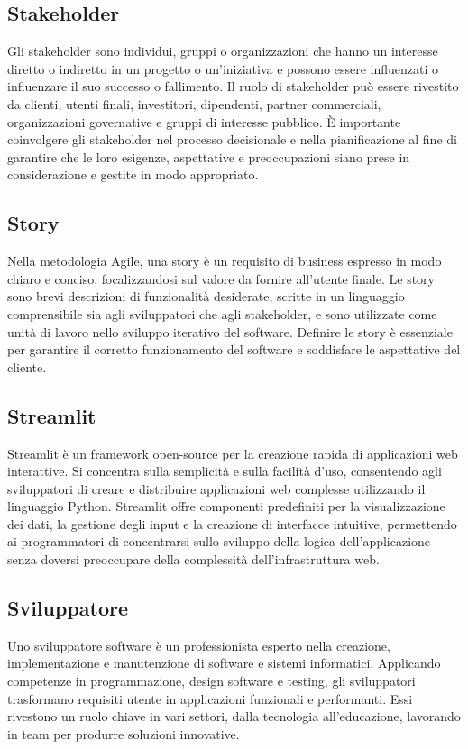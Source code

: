 \vspace{2em}
\subsection*{Stakeholder}
\par Gli stakeholder sono individui, gruppi o organizzazioni che hanno un interesse diretto o indiretto in un progetto o un'iniziativa e possono essere influenzati o influenzare il suo successo o fallimento. Il ruolo di stakeholder può essere rivestito da clienti, utenti finali, investitori, dipendenti, partner commerciali, organizzazioni governative e gruppi di interesse pubblico. È importante coinvolgere gli stakeholder nel processo decisionale e nella pianificazione al fine di garantire che le loro esigenze, aspettative e preoccupazioni siano prese in considerazione e gestite in modo appropriato.

\vspace{2em}
\subsection*{Story}
\par Nella metodologia Agile, una story è un requisito di business espresso in modo chiaro e conciso, focalizzandosi sul valore da fornire all'utente finale. Le story sono brevi descrizioni di funzionalità desiderate, scritte in un linguaggio comprensibile sia agli sviluppatori che agli stakeholder, e sono utilizzate come unità di lavoro nello sviluppo iterativo del software. Definire le story è essenziale per garantire il corretto funzionamento del software e soddisfare le aspettative del cliente.

\vspace{2em}
\subsection*{Streamlit}
\par Streamlit è un framework open-source per la creazione rapida di applicazioni web interattive. Si concentra sulla semplicità e sulla facilità d'uso, consentendo agli sviluppatori di creare e distribuire applicazioni web complesse utilizzando il linguaggio Python. Streamlit offre componenti predefiniti per la visualizzazione dei dati, la gestione degli input e la creazione di interfacce intuitive, permettendo ai programmatori di concentrarsi sullo sviluppo della logica dell'applicazione senza doversi preoccupare della complessità dell'infrastruttura web.

\vspace{2em}
\subsection*{Sviluppatore}
\par Uno sviluppatore software è un professionista esperto nella creazione, implementazione e manutenzione di software e sistemi informatici. Applicando competenze in programmazione, design software e testing, gli sviluppatori trasformano requisiti utente in applicazioni funzionali e performanti. Essi rivestono un ruolo chiave in vari settori, dalla tecnologia all'educazione, lavorando in team per produrre soluzioni innovative.
